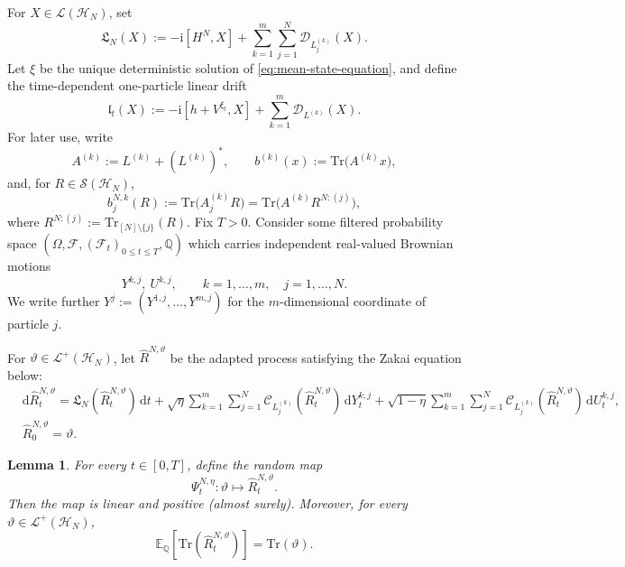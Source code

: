 \documentclass[10pt,a4paper,reqno]{amsart}
\numberwithin{equation}{section}
\theoremstyle{plain}
\newtheorem{lemma}[theorem]{Lemma}
\theoremstyle{definition}
\theoremstyle{remark}
\renewcommand{\d}{\mathrm d}
\renewcommand{\i}{\mathrm i}
\newcommand{\Tr}{\mathrm{Tr}}
\newcommand{\E}{\mathbb E}
\newcommand{\Q}{\mathbb Q}
\newcommand{\cS}{\mathcal S}
\newcommand{\cL}{\mathcal L}
\newcommand{\cF}{\mathcal F}
\newcommand{\cD}{\mathcal D}
\newcommand{\cC}{\mathcal C}
\newcommand{\HH}{\mathcal H}
\newcommand{\1}{\mathbf 1}
\begin{document}
For \(X\in\cL(\HH_N)\), set
\begin{equation}
  \mathfrak L_N(X)
  :=
  -\i[H^N,X]
  +
  \sum_{k=1}^m\sum_{j=1}^N
  \cD_{L_j^{(k)}}(X).
  \label{eq:eta-LN-def}
\end{equation}
Let \(\xi\) be the unique deterministic solution of
\eqref{eq:mean-state-equation}, and define the time-dependent one-particle
linear drift
\begin{equation}
  \mathfrak l_t(X)
  :=
  -\i[h+V^{\xi_t},X]
  +
  \sum_{k=1}^m
  \cD_{L^{(k)}}(X).
  \label{eq:eta-little-l-def}
\end{equation}
For later use, write
\begin{equation}
  A^{(k)}
  :=
  L^{(k)}+(L^{(k)})^*,
  \qquad
  b^{(k)}(x)
  :=
  \Tr\bigl(A^{(k)}x\bigr),
  \label{eq:eta-A-b-def}
\end{equation}
and, for \(R\in\cS(\HH_N)\),
\begin{equation}
  b_j^{N,k}(R)
  :=
  \Tr\bigl(A_j^{(k)}R\bigr)
  =
  \Tr\bigl(A^{(k)}R^{N:(j)}\bigr),
  \label{eq:eta-bNj-def}
\end{equation}
where
\(
  R^{N:(j)}
  :=
  \Tr_{[N]\setminus\{j\}}(R).
\)
Fix $T>0$.  Consider some filtered probability space
\(
  (\Omega,\cF,(\cF_t)_{0\le t\le T},\Q)
\)
which carries independent real-valued Brownian motions
\[
  Y^{k,j},\ U^{k,j},
  \qquad
  k=1,\ldots, m,
  \quad
   j=1,\ldots,  N.
\]
We write further
\(
  Y^j:=(Y^{1,j},\ldots,Y^{m,j})
\)
for the $m$-dimensional coordinate of particle $j$.

For $\vartheta\in\cL^+(\HH_N)$, let 
$\widehat R^{N,\vartheta}$ be the adapted process satisfying the Zakai equation below:
\begin{equation}
\begin{aligned}
 & \d\widehat R_t^{N,\vartheta}
  =
  \mathfrak L_N(\widehat R_t^{N,\vartheta})\,\d t
 +
  \sqrt{\eta}
  \sum_{k=1}^m\sum_{j=1}^N
  \cC_{L_j^{(k)}}(\widehat R_t^{N,\vartheta})\,\d Y_t^{k,j}
  +
  \sqrt{1-\eta}
  \sum_{k=1}^m\sum_{j=1}^N
  \cC_{L_j^{(k)}}(\widehat R_t^{N,\vartheta})\,\d U_t^{k,j},
  \\
  &\widehat R_0^{N,\vartheta}
  =\vartheta.
\end{aligned}
  \label{eq:eta-full-linear-N}
\end{equation}


\begin{lemma}
\label{lem:full-linear-reference}
For every $t\in[0,T]$,  define the random map
\[
  \Psi_t^{N,\eta}:\vartheta
  \longmapsto
  \widehat R_t^{N,\vartheta}.
\]
Then the map is linear and positive (almost surely).  Moreover, for every
$\vartheta\in\cL^+(\HH_N)$,
\begin{equation}
  \E_{\Q}\left[
    \Tr(\widehat R_t^{N,\vartheta})
  \right]
  =
  \Tr(\vartheta).
  \label{eq:eta-full-mean-trace}
\end{equation}
\end{lemma}
\end{document}
